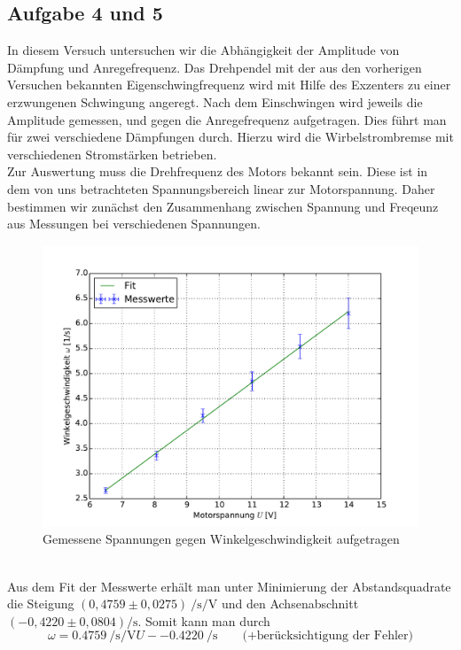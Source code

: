 \subsection{Aufgabe 4 und 5}
In diesem Versuch untersuchen wir die Abhängigkeit der Amplitude von Dämpfung und Anregefrequenz. Das Drehpendel mit der aus den vorherigen Versuchen bekannten Eigenschwingfrequenz wird mit Hilfe des Exzenters zu einer erzwungenen Schwingung angeregt. Nach dem Einschwingen wird jeweils die Amplitude gemessen, und gegen die Anregefrequenz aufgetragen. Dies führt man für zwei verschiedene Dämpfungen durch. Hierzu wird die Wirbelstrombremse mit verschiedenen Stromstärken betrieben.\\
Zur Auswertung muss die Drehfrequenz des Motors bekannt sein. Diese ist in dem von uns betrachteten Spannungsbereich linear zur Motorspannung. Daher bestimmen wir zunächst den Zusammenhang zwischen Spannung und Freqeunz aus Messungen bei verschiedenen Spannungen.
\begin{figure}[h]
	\centering
	\includegraphics[width=\linewidth]{diagramme/eichkurve.pdf}
	\caption[Eichkurve]{Gemessene Spannungen gegen Winkelgeschwindigkeit aufgetragen}
	\label{fig:Eichkurve}
\end{figure}\\
Aus dem Fit der Messwerte erhält man unter Minimierung der Abstandsquadrate die Steigung $ (0{,}4759 \pm 0{,}0275)~\si{\per\second\per\volt} $ und den Achsenabschnitt $ (-0{,}4220 \pm 0{,}0804) \si{\per\second} $. Somit kann man durch 
\begin{equation*}
	\omega = \SI{0.4759}{\per\second\per\volt} U - \SI{-0.4220}{\per\second} \qquad \text{(+berücksichtigung der Fehler)}
\end{equation*}
